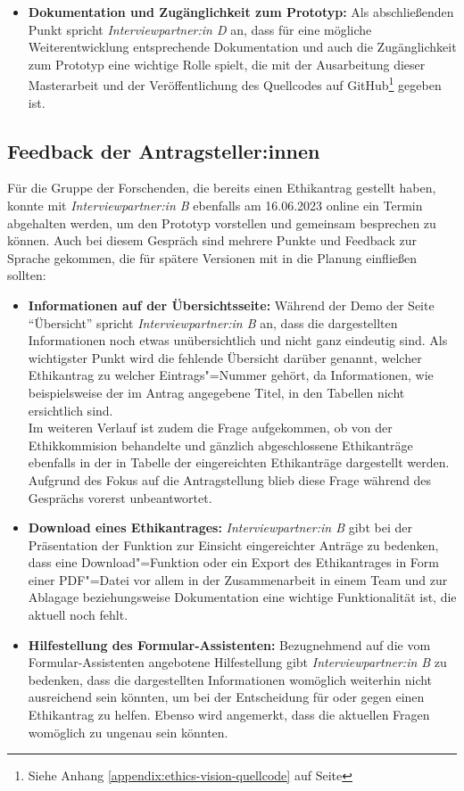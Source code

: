 \documentclass[a4paper,12pt,twoside]{scrreprt}
\begin{document}
\begin{itemize}
    \item \textbf{Dokumentation und Zugänglichkeit zum Prototyp:} Als abschließenden Punkt spricht \textit{Interviewpartner:in D} an, dass für eine mögliche Weiterentwicklung entsprechende Dokumentation und auch die Zugänglichkeit zum Prototyp eine wichtige Rolle spielt, die mit der Ausarbeitung dieser Masterarbeit und der Veröffentlichung des Quellcodes auf GitHub\footnote{Siehe Anhang \ref{appendix:ethics-vision-quellcode} auf Seite \pageref{appendix:ethics-vision-quellcode}} gegeben ist.
\end{itemize}

\subsection{Feedback der Antragsteller:innen}
\label{sub-sec:feedback-antragsteller}

Für die Gruppe der Forschenden, die bereits einen Ethikantrag gestellt haben, konnte mit \textit{Interviewpartner:in B} ebenfalls am 16.06.2023 online ein Termin abgehalten werden, um den Prototyp vorstellen und gemeinsam besprechen zu können. Auch bei diesem Gespräch sind mehrere Punkte und Feedback zur Sprache gekommen, die für spätere Versionen mit in die Planung einfließen sollten:
\begin{itemize}
    \item \textbf{Informationen auf der Übersichtsseite:} Während der Demo der Seite \enquote{Übersicht} spricht \textit{Interviewpartner:in B} an, dass die dargestellten Informationen noch etwas unübersichtlich und nicht ganz eindeutig sind. Als wichtigster Punkt wird die fehlende Übersicht darüber genannt, welcher Ethikantrag zu welcher Eintrags"=Nummer gehört, da Informationen, wie beispielsweise der im Antrag angegebene Titel, in den Tabellen nicht ersichtlich sind.\\
    Im weiteren Verlauf ist zudem die Frage aufgekommen, ob von der Ethikkommision behandelte und gänzlich abgeschlossene Ethikanträge ebenfalls in der in Tabelle der eingereichten Ethikanträge dargestellt werden. Aufgrund des Fokus auf die Antragstellung blieb diese Frage während des Gesprächs vorerst unbeantwortet.
    \item \textbf{Download eines Ethikantrages:} \textit{Interviewpartner:in B} gibt bei der Präsentation der Funktion zur Einsicht eingereichter Anträge zu bedenken, dass eine Download"=Funktion oder ein Export des Ethikantrages in Form einer PDF"=Datei vor allem in der Zusammenarbeit in einem Team und zur Ablagage beziehungsweise Dokumentation eine wichtige Funktionalität ist, die aktuell noch fehlt. 
    \item \textbf{Hilfestellung des Formular-Assistenten:} Bezugnehmend auf die vom Formular-Assistenten angebotene Hilfestellung gibt \textit{Interviewpartner:in B} zu bedenken, dass die dargestellten Informationen womöglich weiterhin nicht ausreichend sein könnten, um bei der Entscheidung für oder gegen einen Ethikantrag zu helfen. Ebenso wird angemerkt, dass die aktuellen Fragen womöglich zu ungenau sein könnten.
\end{itemize}
\end{document}
